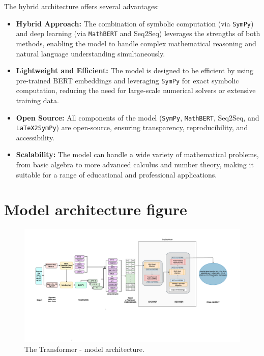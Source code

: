 \documentclass{article}
\begin{document}
The hybrid architecture offers several advantages:

\begin{itemize}
    \item \textbf{Hybrid Approach:} The combination of symbolic computation (via \texttt{SymPy}) and deep learning (via \texttt{MathBERT} and Seq2Seq) leverages the strengths of both methods, enabling the model to handle complex mathematical reasoning and natural language understanding simultaneously.
    \item \textbf{Lightweight and Efficient:} The model is designed to be efficient by using pre-trained BERT embeddings and leveraging \texttt{SymPy} for exact symbolic computation, reducing the need for large-scale numerical solvers or extensive training data.
    \item \textbf{Open Source:} All components of the model (\texttt{SymPy}, \texttt{MathBERT}, Seq2Seq, and \texttt{LaTeX2SymPy}) are open-source, ensuring transparency, reproducibility, and accessibility.
    \item \textbf{Scalability:} The model can handle a wide variety of mathematical problems, from basic algebra to more advanced calculus and number theory, making it suitable for a range of educational and professional applications.
\end{itemize}


\section{Model architecture figure}


\begin{figure}[htbp]
  \centering
  \includegraphics[scale=0.25]{./figures/Model_architecture_figure.png}
  \caption{The Transformer - model architecture.}
  \label{fig:model-arch}
\end{figure}
\end{document}

